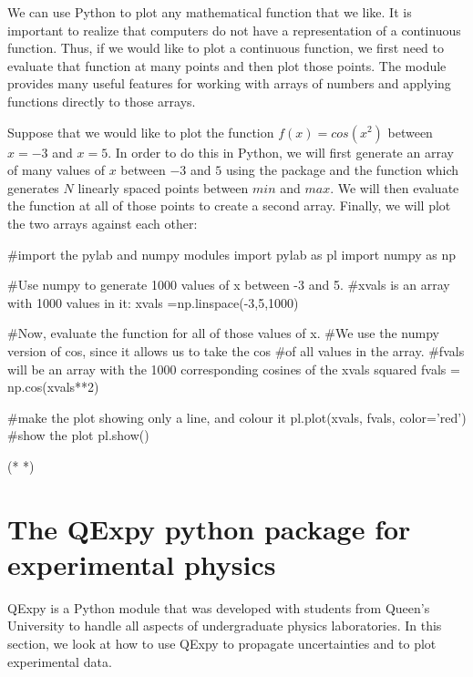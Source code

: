 We can use Python to plot any mathematical function that we like. It is important to realize that computers do not have a representation of a continuous function. Thus, if we would like to plot a continuous function, we first need to evaluate that function at many points and then plot those points. The  module provides many useful features for working with arrays of numbers and applying functions directly to those arrays. 

Suppose that we would like to plot the function $f(x) = cos(x^2)$ between $x=-3$ and $x=5$. In order to do this in Python, we will first generate an array of many values of $x$ between $-3$ and $5$ using the  package and the function  which generates $N$ linearly spaced points between $min$ and $max$. We will then evaluate the function at all of those points to create a second array. Finally, we will plot the two arrays against each other:
\begin{python}[caption=Plotting a function of 1 variable]
#import the pylab and numpy modules
import pylab as pl
import numpy as np

#Use numpy to generate 1000 values of x between -3 and 5.
#xvals is an array with 1000 values in it:
xvals =np.linspace(-3,5,1000) 

#Now, evaluate the function for all of those values of x.
#We use the numpy version of cos, since it allows us to take the cos 
#of all values in the array.
#fvals will be an array with the 1000 corresponding cosines of the xvals squared
fvals = np.cos(xvals**2)

#make the plot showing only a line, and colour it
pl.plot(xvals, fvals, color='red')
#show the plot
pl.show()

\end{python}
\begin{poutput}
(*   *)
\end{poutput}

\section{The QExpy python package for experimental physics}
QExpy is a Python module that was developed with students from Queen's University to handle all aspects of undergraduate physics laboratories. In this section, we look at how to use QExpy to propagate uncertainties and to plot experimental data.

